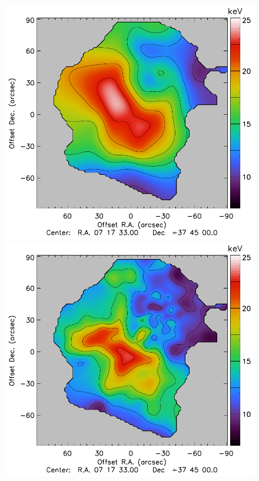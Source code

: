 \documentclass[twocolumn,traditabstract]{aa}
\begin{document}
\begin{figure}[h]
\centering
\includegraphics[trim=0cm 0cm 1.4cm 0cm, clip=true, totalheight=7.6cm]{Figure/Thermo_TCXO.pdf}
\includegraphics[trim=0cm 0cm 0cm 0cm, clip=true, totalheight=7.6cm]{Figure/Thermo_TXMM.pdf}

\end{figure}
\end{document}
